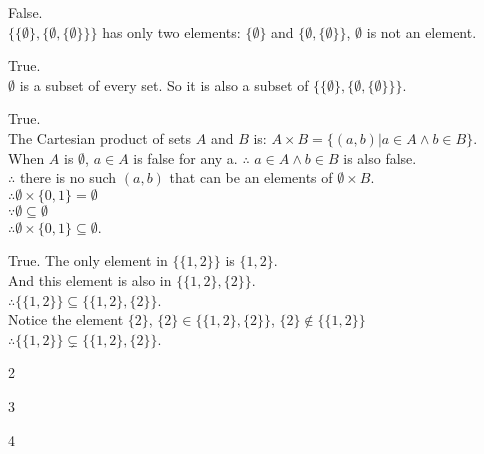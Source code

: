 \documentclass[12pt]{exam}
\begin{document}
\begin{solution}
    \begin{qparts}
        \item 
        \begin{qsubparts}
            \item False.\\
            $\{\{\emptyset\}, \{\emptyset , \{\emptyset\}\}\}$ has only two elements: $\{\emptyset\}$ and $\{ \emptyset, \{ \emptyset\}\}$, $\emptyset$ is not an element.
            \item True.\\
            $\emptyset$ is a subset of every set. So it is also a subset of $\{\{\emptyset\}, \{\emptyset , \{\emptyset\}\}\}$.
            \item True.\\
            The Cartesian product of sets $A$ and $B$ is: $ A \times B = \{ (a,b)| a \in A \land b \in B\}$.\\
            When $A$ is $\emptyset$, $a\in A$ is false for any a. $\therefore$ $a \in A \land b \in B$ is also false.\\
            $\therefore$ there is no such $(a,b)$ that can be an elements of $\emptyset \times B$.\\
            $\therefore \emptyset \times  \{0,1\} = \emptyset$\\ 
            $\because \emptyset \subseteq \emptyset$\\
            $\therefore \emptyset \times \{ 0,1\} \subseteq \emptyset$.   
            \item True.
            The only element in $\{\{1, 2\}\}$ is $\{1,2\}$.\\
            And this element is also in $\{ \{1,2\}, \{2\} \}$.\\
            $\therefore \{\{1, 2\}\} \subseteq \{ \{1,2\}, \{2\} \}$.\\
            Notice the element $\{2\}$, $\{2\} \in \{ \{1,2\}, \{2\} \}$, $\{2\} \notin \{\{1, 2\}\}$\\
            $\therefore \{\{1, 2\}\} \subsetneq \{ \{1,2\}, \{2\} \}$.
        \end{qsubparts}

        \item 2
        \item 3
        \item 4
    \end{qparts}
\end{solution}
\end{document}
